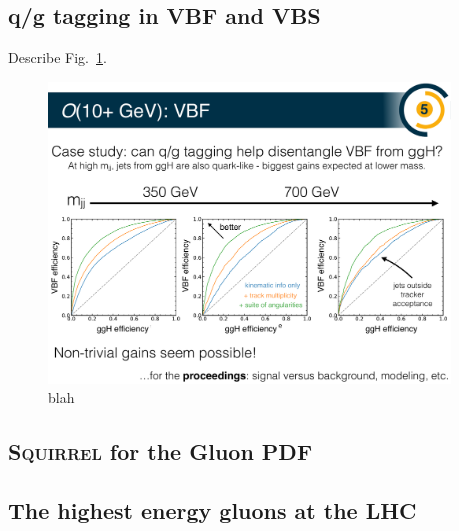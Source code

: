 \documentclass[11pt]{cernrep}
\begin{document}


\clearpage

\subsection{q/g tagging in VBF and VBS}
\label{sec:jets:vbsbvf}

Describe Fig.~\ref{fig:jets:qg}.

\begin{figure}[h!]
\centering
\includegraphics[width=0.95\textwidth]{figs/qgstudy.pdf}
\caption{blah}
\label{fig:jets:qg}
\end{figure}

\subsection{\textsc{Squirrel} for the Gluon PDF}
\label{sec:jets:pdf}



\subsection{The highest energy gluons at the LHC}
\label{sec:jets:highest}
\end{document}
